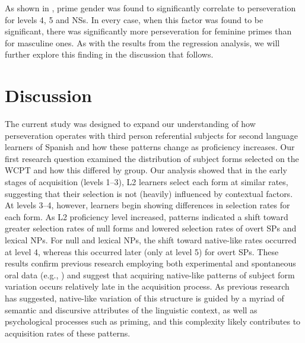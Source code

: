 \documentclass[output=paper]{langscibook}
\begin{document}
As shown in , prime gender was found to significantly correlate to perseveration for levels 4, 5 and NSs. In every case, when this factor was found to be significant, there was significantly more perseveration for feminine primes than for masculine ones. As with the results from the regression analysis, we will further explore this finding in the discussion that follows.


\section{Discussion}

The current study was designed to expand our understanding of how perseveration operates with third person referential subjects for second language learners of Spanish and how these patterns change as proficiency increases. Our first research question examined the distribution of subject forms selected on the WCPT and how this differed by group. Our analysis showed that in the early stages of acquisition (levels 1–3), L2 learners select each form at similar rates, suggesting that their selection is not (heavily) influenced by contextual factors. At levels 3–4, however, learners begin showing differences in selection rates for each form. As L2 proficiency level increased, patterns indicated a shift toward greater selection rates of null forms and lowered selection rates of overt SPs and lexical NPs. For null and lexical NPs, the shift toward native-like rates occurred at level 4, whereas this occurred later (only at level 5) for overt SPs. These results confirm previous research employing both experimental and spontaneous oral data (e.g., \citealt{GeeslinGudmestad2010, GeeslinGudmestad2011}) and suggest that acquiring native-like patterns of subject form variation occurs relatively late in the acquisition process. As previous research has suggested, native-like variation of this structure is guided by a myriad of semantic and discursive attributes of the linguistic context, as well as psychological processes such as priming, and this complexity likely contributes to acquisition rates of these patterns. 
\end{document}
